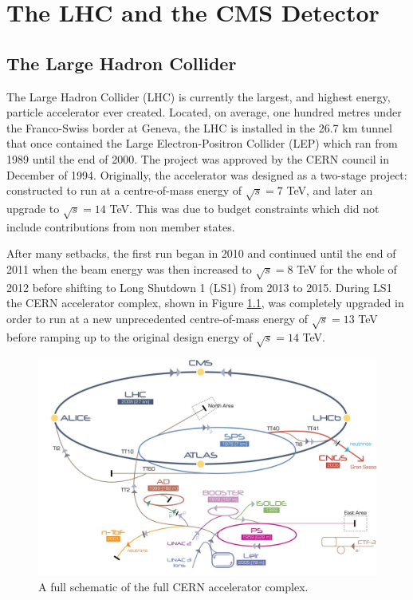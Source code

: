 \chapter{The LHC and the CMS Detector} \label{chap-detector}

\section{The Large Hadron Collider} \label{sec-TheLargeHadronCollider}

The Large Hadron Collider (LHC) is currently the largest, and highest energy, particle accelerator ever created. Located, on average, one hundred metres under the Franco-Swiss border at Geneva, the LHC is installed in the 26.7 km tunnel that once contained the Large Electron-Positron Collider (LEP) which ran from 1989 until the end of 2000. The project was approved by the CERN council in December of 1994. Originally, the accelerator was designed as a two-stage project: constructed to run at a centre-of-mass energy of $\sqrt{s}=7$ TeV, and later an upgrade to $\sqrt{s}=14$ TeV. This was due to budget constraints which did not include contributions from non member states. 

After many setbacks, the first run began in 2010 and continued until the end of 2011 when the beam energy was then increased to $\sqrt{s}=8$ TeV for the whole of 2012 before shifting to Long Shutdown 1 (LS1) from 2013 to 2015. During LS1 the CERN accelerator complex, shown in Figure \ref{fig-CERNAcceleratorComplex}, was completely upgraded in order to run at a new unprecedented centre-of-mass energy of $\sqrt{s}=13$ TeV before ramping up to the original design energy of $\sqrt{s}=14$ TeV. 

\begin{figure}
\includegraphics[width=\textwidth]{Figures/CERNAcceleratorComplex.jpg}
\caption{A full schematic of the full CERN accelerator complex.}
\label{fig-CERNAcceleratorComplex}
\end{figure}

